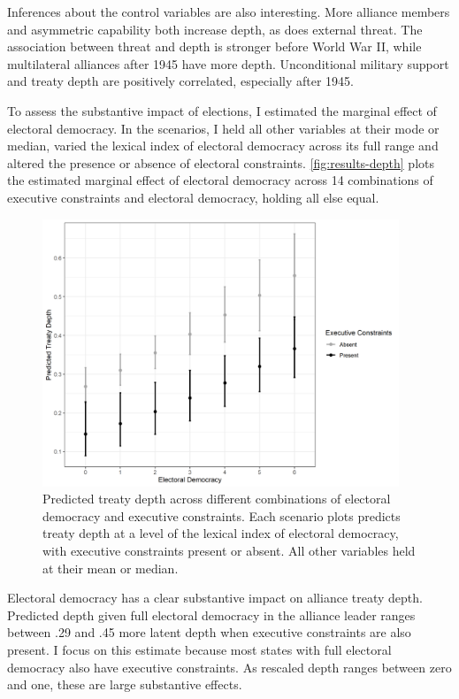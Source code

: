 \documentclass[12pt]{article}
\begin{document}
Inferences about the control variables are also interesting.
More alliance members and asymmetric capability both increase depth, as does external threat.
The association between threat and depth is stronger before World War II, while multilateral alliances after 1945 have more depth. 
Unconditional military support and treaty depth are positively correlated, especially after 1945. 


To assess the substantive impact of elections, I estimated the marginal effect of electoral democracy. 
In the scenarios, I held all other variables at their mode or median, varied the lexical index of electoral democracy across its full range and altered the presence or absence of electoral constraints. 
\autoref{fig:results-depth} plots the estimated marginal effect of electoral democracy across 14 combinations of executive constraints and electoral democracy, holding all else equal. 


\begin{figure}[hbtp]
\centering
\includegraphics[width=0.95\textwidth]{../figures/results-depth.png}
\caption{Predicted treaty depth across different combinations of electoral democracy and executive constraints. Each scenario plots predicts treaty depth at a level of the lexical index of electoral democracy, with executive constraints present or absent. All other variables held at their mean or median.}
\label{fig:results-depth}
\end{figure}


Electoral democracy has a clear substantive impact on alliance treaty depth.
Predicted depth given full electoral democracy in the alliance leader ranges between .29 and .45 more latent depth when executive constraints are also present.
I focus on this estimate because most states with full electoral democracy also have executive constraints. 
As rescaled depth ranges between zero and one, these are large substantive effects.
\end{document}
